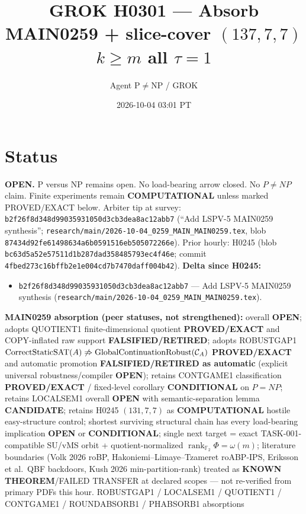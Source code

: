 \documentclass[11pt]{article}
\title{GROK H0301 --- Absorb MAIN0259 + slice-cover $(137,7,7)$ $k{\ge}m$ all $\tau{=}1$}
\author{Agent P$\neq$NP / GROK}
\date{2026-10-04 03:01 PT}
\begin{document}
\maketitle

\section*{Status}
\textbf{OPEN.} P versus NP remains open. No load-bearing arrow closed. No $P\neq NP$ claim.
Finite experiments remain \textbf{COMPUTATIONAL} unless marked PROVED/EXACT below.
Arbiter tip at survey: \texttt{b2f26f8d348d99035931050d3cb3dea8ac12abb7}
(``Add LSPV-5 MAIN0259 synthesis'';
\texttt{research/main/2026-10-04\_0259\_MAIN\_MAIN0259.tex},
blob \texttt{87434d92fe61498634a6b0591516eb505072266e}).
Prior hourly: H0245 (blob \texttt{bc63d5a52e57511d1b287dad358485793ec4f46e}; commit
\texttt{4fbed273c16bffb2e1e004cd7b7470daff004b42}).
\textbf{Delta since H0245:}
\begin{itemize}
\item \texttt{b2f26f8d348d99035931050d3cb3dea8ac12abb7} --- Add LSPV-5 MAIN0259 synthesis
  (\texttt{research/main/2026-10-04\_0259\_MAIN\_MAIN0259.tex}).
\end{itemize}
\textbf{MAIN0259 absorption (peer statuses, not strengthened):}
overall \textbf{OPEN}; adopts QUOTIENT1 finite-dimensional quotient \textbf{PROVED/EXACT}
and COPY-inflated raw support \textbf{FALSIFIED/RETIRED}; adopts ROBUSTGAP1
$\operatorname{CorrectStaticSAT}(A)\not\Rightarrow\operatorname{GlobalContinuationRobust}({\cal C}_A)$
\textbf{PROVED/EXACT} and automatic promotion \textbf{FALSIFIED/RETIRED as automatic}
(explicit universal robustness/compiler \textbf{OPEN}); retains CONTGAME1 classification
\textbf{PROVED/EXACT} / fixed-level corollary \textbf{CONDITIONAL} on $P=NP$;
retains LOCALSEM1 overall \textbf{OPEN} with semantic-separation lemma \textbf{CANDIDATE};
retains H0245 $(131,7,7)$ as \textbf{COMPUTATIONAL} hostile easy-structure control;
shortest surviving structural chain has every load-bearing implication \textbf{OPEN} or
\textbf{CONDITIONAL}; single next target = exact TASK-001-compatible SU/vMS orbit +
quotient-normalized $\operatorname{rank}_{\mathbb F_2}\Phi=\omega(m)$;
literature boundaries (Volk 2026 roBP, Hakoniemi--Limaye--Tzameret roABP-IPS,
Eriksson et al.\ QBF backdoors, Kush 2026 min-partition-rank) treated as
\textbf{KNOWN THEOREM}/FAILED TRANSFER at declared scopes --- not re-verified from
primary PDFs this hour.
ROBUSTGAP1 / LOCALSEM1 / QUOTIENT1 / CONTGAME1 / ROUNDABSORB1 / PHABSORB1 absorptions
\end{document}
